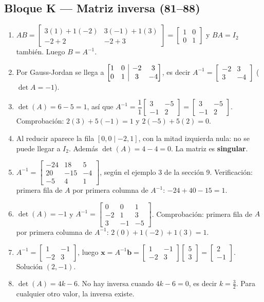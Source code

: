 \documentclass[12pt, letterpaper]{article}
\makeatletter
\newcommand{\mwmat}[1]{\ensuremath{\begin{bmatrix}#1\end{bmatrix}}}
\newcommand{\mwaug}[2]{\ensuremath{\left[\begin{array}{@{}#1@{}}#2\end{array}\right]}}
\makeatother
\begin{document}
\subsection*{Bloque K — Matriz inversa (81--88)}
\begin{enumerate}[label=\textbf{\arabic*.}, start=81, leftmargin=*]
  \item $AB=\mwmat{3(1)+1(-2) & 3(-1)+1(3)\\-2+2 & -2+3}
        =\mwmat{1&0\\0&1}$ y $BA=I_2$ también. Luego $B=A^{-1}$.
  \item Por Gauss-Jordan se llega a
        $\mwaug{cc|cc}{1&0&-2&3\\0&1&3&-4}$, es decir
        $A^{-1}=\mwmat{-2&3\\3&-4}$ ($\det A=-1$).
  \item $\det(A)=6-5=1$, así que
        $A^{-1}=\dfrac{1}{1}\mwmat{3&-5\\-1&2}=\mwmat{3&-5\\-1&2}$.
        Comprobación: $2(3)+5(-1)=1$ y $2(-5)+5(2)=0$. \checkmark
  \item Al reducir aparece la fila $[0,0\mid-2,1]$, con la mitad izquierda
        nula: no se puede llegar a $I_2$. Además
        $\det(A)=4-4=0$. La matriz es \textbf{singular}.
  \item $A^{-1}=\mwmat{-24&18&5\\20&-15&-4\\-5&4&1}$, según el ejemplo 3 de
        la sección 9. Verificación: primera fila de $A$ por primera columna de
        $A^{-1}$: $-24+40-15=1$.
  \item $\det(A)=-1$ y
        $A^{-1}=\mwmat{0&0&1\\-2&1&3\\3&-1&-5}$. Comprobación:
        primera fila de $A$ por primera columna de $A^{-1}$:
        $2(0)+1(-2)+1(3)=1$. \checkmark
  \item $A^{-1}=\mwmat{1&-1\\-2&3}$, luego
        $\mathbf{x}=A^{-1}\mathbf{b}
        =\mwmat{1&-1\\-2&3}\mwmat{5\\3}=\mwmat{2\\-1}$.
        Solución $(2,-1)$.
  \item $\det(A)=4k-6$. No hay inversa cuando $4k-6=0$, es decir
        $k=\tfrac32$. Para cualquier otro valor, la inversa existe.
\end{enumerate}

\fi
\end{document}

